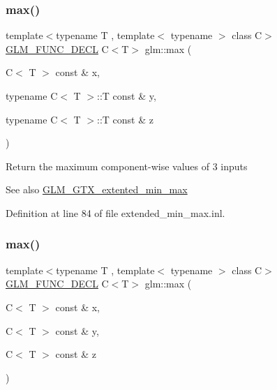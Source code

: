 \subsubsection{\texorpdfstring{max()}{max()}\hspace{0.1cm}{\footnotesize\ttfamily [2/6]}}
{\footnotesize\ttfamily template$<$typename T , template$<$ typename $>$ class C$>$ \\
\mbox{\hyperlink{setup_8hpp_ab2d052de21a70539923e9bcbf6e83a51}{G\+L\+M\+\_\+\+F\+U\+N\+C\+\_\+\+D\+E\+CL}} C$<$T$>$ glm\+::max (\begin{DoxyParamCaption}\item[{C$<$ T $>$ const \&}]{x,  }\item[{typename C$<$ T $>$\+::T const \&}]{y,  }\item[{typename C$<$ T $>$\+::T const \&}]{z }\end{DoxyParamCaption})}

Return the maximum component-\/wise values of 3 inputs \begin{DoxySeeAlso}{See also}
\mbox{\hyperlink{group__gtx__extented__min__max}{G\+L\+M\+\_\+\+G\+T\+X\+\_\+extented\+\_\+min\+\_\+max}} 
\end{DoxySeeAlso}


Definition at line 84 of file extended\+\_\+min\+\_\+max.\+inl.

\mbox{\label{group__gtx__extented__min__max_gaf832e9d4ab4826b2dda2fda25935a3a4}} 
\subsubsection{\texorpdfstring{max()}{max()}\hspace{0.1cm}{\footnotesize\ttfamily [3/6]}}
{\footnotesize\ttfamily template$<$typename T , template$<$ typename $>$ class C$>$ \\
\mbox{\hyperlink{setup_8hpp_ab2d052de21a70539923e9bcbf6e83a51}{G\+L\+M\+\_\+\+F\+U\+N\+C\+\_\+\+D\+E\+CL}} C$<$T$>$ glm\+::max (\begin{DoxyParamCaption}\item[{C$<$ T $>$ const \&}]{x,  }\item[{C$<$ T $>$ const \&}]{y,  }\item[{C$<$ T $>$ const \&}]{z }\end{DoxyParamCaption})}


